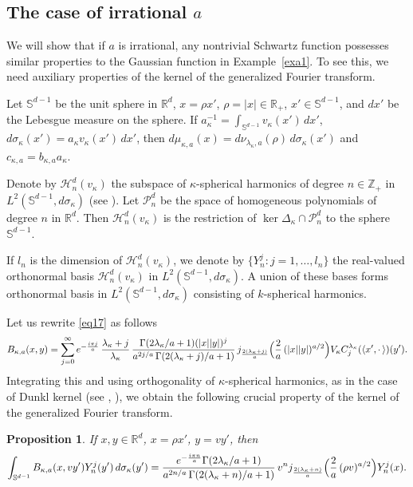 \documentclass[12pt,twoside,reqno]{amsart}\usepackage[cp1251]{inputenc}
\theoremstyle{plain}
\newtheorem{proposition}[theorem]{Proposition}
\theoremstyle{remark}
\begin{document}
\subsection{The case of irrational $a$}
We will show that if  $a$ is irrational, any nontrivial Schwartz function possesses similar  properties to the Gaussian function
  in Example~\ref{exa1}. To see this, we need auxiliary  properties of the kernel of the generalized Fourier transform.

Let $\mathbb{S}^{d-1}$ be the unit sphere in $\mathbb{R}^{d}$, $x=\rho x'$, $\rho=|x|\in\mathbb{R}_+$, $x'\in\mathbb{S}^{d-1}$, and $dx'$ be the Lebesgue measure on the sphere. If $a_{\kappa}^{-1}=\int_{\mathbb{S}^{d-1}}v_{\kappa}(x')\,dx'$,\,\, $d\sigma_{\kappa}(x')=a_{\kappa}v_{\kappa}(x')\,dx'$, then $d\mu_{\kappa,a}(x)=d\nu_{\lambda_{\kappa},a}(\rho)\,d\sigma_{\kappa}(x')$ and $c_{\kappa,a}=b_{\kappa,a}a_{\kappa}$.

Denote by $\mathcal{H}_{n}^{d}(v_{\kappa})$ the subspace of $\kappa$-spherical harmonics
of degree $n\in \mathbb{Z}_{+}$ in $L^{2} (\mathbb{S}^{d-1},d\sigma_{\kappa})$ (see
\cite[Chap.~5]{DunXu01}). Let $\mathcal{P}_{n}^{d}$ be the space of homogeneous
polynomials of degree $n$ in $\mathbb{R}^{d}$. Then $\mathcal{H}_{n}^{d}(v_{\kappa})$ is the
restriction of $\ker \Delta_{\kappa}\cap \mathcal{P}_{n}^{d}$ to the sphere
$\mathbb{S}^{d-1}$.

If $l_{n}$ is the dimension of $\mathcal{H}_{n}^{d}(v_{\kappa})$, we denote by
$\{Y_{n}^{j}\colon j=1,\ldots,l_{n}\}$ the real-valued orthonormal basis
$\mathcal{H}_{n}^{d}(v_{\kappa})$ in $L^{2}(\mathbb{S}^{d-1},d\sigma_{\kappa})$.
 A union of these bases forms orthonormal basis in
$L^{2}(\mathbb{S}^{d-1},d\sigma_{\kappa})$ consisting of
$k$-spherical harmonics.

Let us rewrite \eqref{eq17} as follows
\[
B_{\kappa,a}(x,y)
=\sum_{j=0}^{\infty}e^{-\frac{i\pi j}{a}}\,\frac{\lambda_{\kappa}+j}{\lambda_{\kappa}}\,\frac{\Gamma(2\lambda_{\kappa}/a+1)(|x||y|)^{j}}{a^{2j/a}\,\Gamma(2(\lambda_{\kappa}+j)/a+1)}\,
j_{\frac{2(\lambda_{\kappa}+j)}{a}}\Bigl(\frac{2}{a}\,(|x||y|)^{a/2}\Bigr)V_{\kappa}C_{j}^{\lambda_{\kappa}}(\langle x',{\cdot}\,\rangle)(y').
\]
Integrating this and using orthogonality of $\kappa$-spherical harmonics, as in the case of Dunkl kernel
 (see \cite[Theorem 5.3.4]{DunXu01}, \cite[Corollary 2.5]{Ro03}), we obtain the following crucial
 property of the kernel of the generalized Fourier transform.

\begin{proposition}\label{lem7}
If $x,y\in\mathbb{R}^d$, $x=\rho x'$, $y=vy'$, then
\[
\int_{\mathbb{S}^{d-1}}B_{\kappa,a}(x,vy')Y_{n}^{j}(y')\,d\sigma_{\kappa}(y')=\frac{e^{-\frac{i\pi n}{a}}\Gamma(2\lambda_{\kappa}/a+1)}{a^{2n/a}
\,\Gamma(2(\lambda_{\kappa}+n)/a+1)}\,v^n
j_{\frac{2(\lambda_{\kappa}+n)}{a}}\Bigl(\frac{2}{a}\,(\rho v)^{a/2}\Bigr)Y_n^j(x).
\]
\end{proposition}
\end{document}
